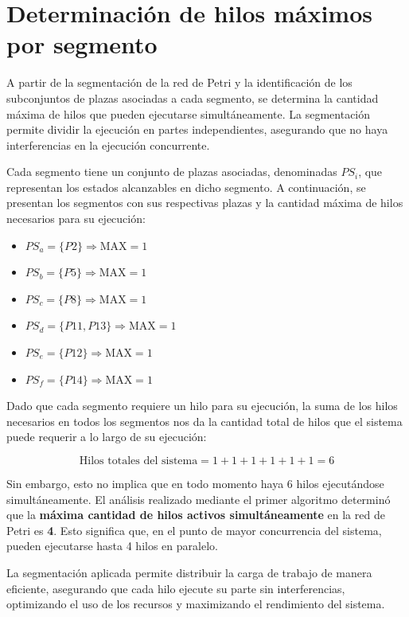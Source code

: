 \documentclass[12pt]{article}
\begin{document}
\section{Determinación de hilos máximos por segmento}

A partir de la segmentación de la red de Petri y la identificación de los subconjuntos de plazas asociadas a cada segmento, se determina la cantidad máxima de hilos que pueden ejecutarse simultáneamente. La segmentación permite dividir la ejecución en partes independientes, asegurando que no haya interferencias en la ejecución concurrente.

Cada segmento tiene un conjunto de plazas asociadas, denominadas \(PS_i\), que representan los estados alcanzables en dicho segmento. A continuación, se presentan los segmentos con sus respectivas plazas y la cantidad máxima de hilos necesarios para su ejecución:

\begin{itemize}
    \item \(PS_a = \{P2\} \Rightarrow \text{MAX} = 1\)
    \item \(PS_b = \{P5\} \Rightarrow \text{MAX} = 1\)
    \item \(PS_c = \{P8\} \Rightarrow \text{MAX} = 1\)
    \item \(PS_d = \{P11, P13\} \Rightarrow \text{MAX} = 1\)
    \item \(PS_e = \{P12\} \Rightarrow \text{MAX} = 1\)
    \item \(PS_f = \{P14\} \Rightarrow \text{MAX} = 1\)
\end{itemize}

Dado que cada segmento requiere un hilo para su ejecución, la suma de los hilos necesarios en todos los segmentos nos da la cantidad total de hilos que el sistema puede requerir a lo largo de su ejecución:

\[
\text{Hilos totales del sistema} = 1 + 1 + 1 + 1 + 1 + 1 = 6
\]

Sin embargo, esto no implica que en todo momento haya 6 hilos ejecutándose simultáneamente.  
El análisis realizado mediante el primer algoritmo determinó que la \textbf{máxima cantidad de hilos activos simultáneamente} en la red de Petri es \textbf{4}. Esto significa que, en el punto de mayor concurrencia del sistema, pueden ejecutarse hasta 4 hilos en paralelo.  

La segmentación aplicada permite distribuir la carga de trabajo de manera eficiente, asegurando que cada hilo ejecute su parte sin interferencias, optimizando el uso de los recursos y maximizando el rendimiento del sistema.
\end{document}
